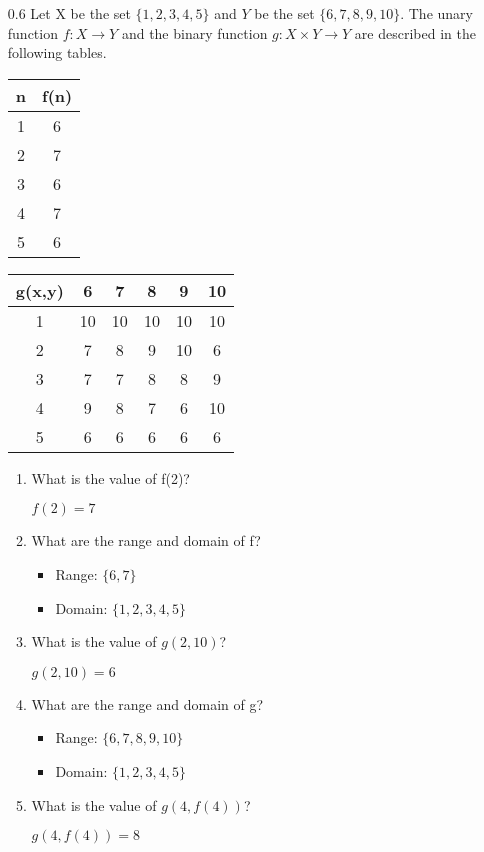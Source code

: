 \begin{enumerate}
    \item[0.6]
Let X be the set $\{1, 2, 3, 4, 5\}$ and $Y$ be the set $\{6, 7, 8, 9, 10\}$. The unary function $f: X \to Y$ and the binary function $g: X \times Y \to Y$ are described in the following tables.

\begin{tabular}{ c | c }
    n & f(n) \\
    \hline
    1 & 6 \\
    2 & 7 \\
    3 & 6 \\
    4 & 7 \\
    5 & 6 \\
\end{tabular}
\begin{tabular}{ c | c | c | c | c | c }
    g(x,y) & 6 & 7 & 8 & 9 & 10 \\
    \hline
    1 & 10 & 10 & 10 & 10 & 10 \\
    2 & 7 & 8 & 9 & 10 & 6 \\
    3 & 7 & 7 & 8 & 8 & 9 \\
    4 & 9 & 8 & 7 & 6 & 10 \\
    5 & 6 & 6 & 6 & 6 & 6 \\
\end{tabular}
\begin{enumerate}
\item What is the value of f(2)? 

    $f(2) = 7$
\item What are the range and domain of f?
\begin{itemize}
    \item Range: $\{6, 7\}$
    \item Domain: $\{1, 2, 3, 4, 5\}$
\end{itemize}

\item What is the value of $g(2, 10)$?

    $g(2, 10) = 6$
\item What are the range and domain of g?
\begin{itemize}
    \item Range: $\{6, 7, 8, 9, 10\}$
    \item Domain: $\{1, 2, 3, 4, 5\}$
\end{itemize}

\item What is the value of $g(4, f(4))$?

    $g(4, f(4)) = 8$
\end{enumerate}


\end{enumerate}
